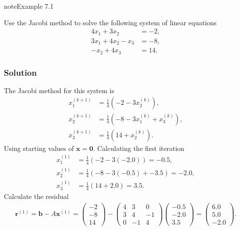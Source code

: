 \documentclass[letterpaper,10pt,english]{jupyterBook}
\begin{document}
\begin{sphinxadmonition}{note}{Example 7.1}

\sphinxAtStartPar
Use the Jacobi method to solve the following system of linear equations
\begin{align*}
    4x_1 +3x_2 &=-2, \\
    3x_1 +4x_2 -x_3 &=-8, \\
    -x_2 +4x_3 &=14.
\end{align*}\subsubsection*{Solution}

\sphinxAtStartPar
The Jacobi method for this system is
\begin{align*}
    x_{1}^{(k+1)} &= \frac{1}{4} \left( -2 - 3 x_{2}^{(k)} \right), \\
    x_{2}^{(k+1)} &= \frac{1}{4} \left( -8 - 3 x_{1}^{(k)} + x_{3}^{(k)} \right), \\
    x_{3}^{(k+1)} &= \frac{1}{4} \left( 14 + x_{2}^{(k)} \right).
\end{align*}
\sphinxAtStartPar
Using starting values of \(\mathbf{x} = \mathbf{0}\). Calculating the first iteration
\begin{align*}
    x_{1}^{(1)} &= \frac{1}{4} \left( -2 - 3 (-2.0) \right) = -0.5, \\
    x_{2}^{(1)} &= \frac{1}{4} \left( -8 - 3 (-0.5) + -3.5 \right) = -2.0, \\
    x_{3}^{(1)} &= \frac{1}{4} \left( 14 + 2.0 \right) = 3.5.
\end{align*}
\sphinxAtStartPar
Calculate the residual
\begin{align*}
    \mathbf{r}^{(1)} = \mathbf{b} - A \mathbf{x}^{(1)} = 
    \begin{pmatrix} -2 \\ -8 \\ 14 \end{pmatrix} -
    \begin{pmatrix} 4 & 3 & 0 \\ 3 & 4 & -1 \\ 0 & -1 & 4 \end{pmatrix}
    \begin{pmatrix} -0.5 \\ -2.0 \\ 3.5 \end{pmatrix} =
    \begin{pmatrix} 6.0 \\ 5.0 \\ -2.0 \end{pmatrix}.

\end{align*}
\end{sphinxadmonition}
\end{document}
